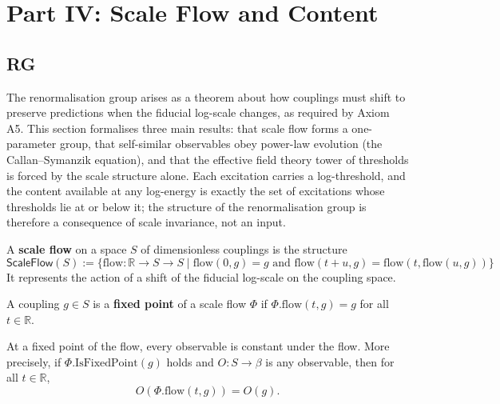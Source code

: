 \section{Part IV: Scale Flow and Content}

\subsection{RG}

The renormalisation group arises as a theorem about how couplings must shift to preserve predictions when the fiducial log-scale changes, as required by Axiom A5. This section formalises three main results: that scale flow forms a one-parameter group, that self-similar observables obey power-law evolution (the Callan--Symanzik equation), and that the effective field theory tower of thresholds is forced by the scale structure alone. Each excitation carries a log-threshold, and the content available at any log-energy is exactly the set of excitations whose thresholds lie at or below it; the structure of the renormalisation group is therefore a consequence of scale invariance, not an input.

\begin{definition}
A \textbf{scale flow} on a space $S$ of dimensionless couplings is the structure
\begin{equation}
\mathsf{ScaleFlow}(S) := \{
  \text{flow} : \mathbb{R} \to S \to S
  \mid
  \text{flow}(0, g) = g \text{ and } \text{flow}(t+u, g) = \text{flow}(t, \text{flow}(u, g))
\}
\end{equation}
It represents the action of a shift of the fiducial log-scale on the coupling space. 
\end{definition}

\begin{definition}
A coupling $g \in S$ is a \textbf{fixed point} of a scale flow $\Phi$ if $\Phi.\text{flow}(t, g) = g$ for all $t \in \mathbb{R}$. 
\end{definition}

\begin{theorem}
At a fixed point of the flow, every observable is constant under the flow. More precisely, if $\Phi.\text{IsFixedPoint}(g)$ holds and $O : S \to \beta$ is any observable, then for all $t \in \mathbb{R}$,
\begin{equation}
O(\Phi.\text{flow}(t, g)) = O(g) .
\end{equation}
\end{theorem}

